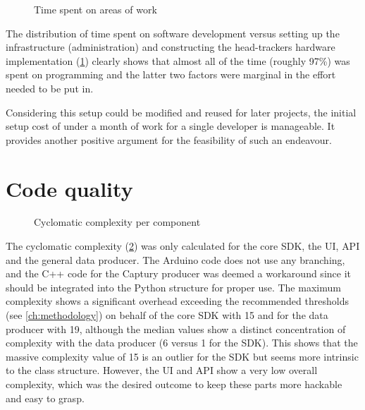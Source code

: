 \begin{figure}[h]
\centering

\caption[Time spent on areas of work]{Time spent on areas of work\protect}
\label{fig:timeSpentTypeOfWork}
\end{figure}

The distribution of time spent on software development versus setting up the infrastructure (administration) and constructing the head-tracker\textsinglequote s hardware implementation (\ref{fig:timeSpentTypeOfWork}) clearly shows that almost all of the time (roughly 97\%) was spent on programming and the latter two factors were marginal in the effort needed to be put in.

Considering this setup could be modified and reused for later projects, the initial setup cost of under a month of work for a single developer is manageable.
It provides another positive argument for the feasibility of such an endeavour.

\section{Code quality}
\label{sec:code-quality}

\begin{figure}[h]
\centering

\caption[Cyclomatic complexity]{Cyclomatic complexity per component\protect}
\label{fig:cyclomaticComplexity}
\end{figure}

The cyclomatic complexity (\ref{fig:cyclomaticComplexity}) was only calculated for the core \ac{SDK}, the \ac{UI}, \ac{API} and the general data producer.
The Arduino code does not use any branching, and the C++ code for the Captury producer was deemed a workaround since it should be integrated into the Python structure for proper use.
The maximum complexity shows a significant overhead exceeding the recommended thresholds (see \autoref{ch:methodology}) on behalf of the core \ac{SDK} with 15 and for the data producer with 19, although the median values show a distinct concentration of complexity with the data producer (6 versus 1 for the \ac{SDK}).
This shows that the massive complexity value of 15 is an outlier for the \ac{SDK} but seems more intrinsic to the  class structure.
However, the \ac{UI} and \ac{API} show a very low overall complexity, which was the desired outcome to keep these parts more hackable and easy to grasp.

